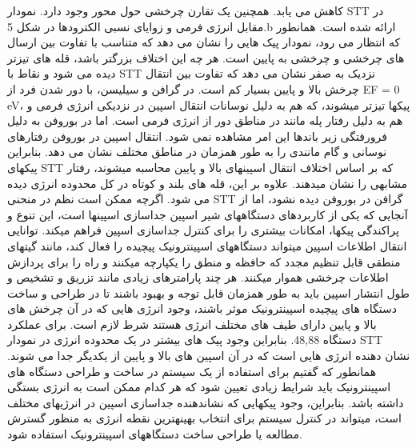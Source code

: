 کاهش می یابد. همچنین یک تقارن چرخشی حول محور وجود دارد. نمودار STT در مقابل انرژی فرمی و زوایای نسبی الکترودها در شکل 5.b ارائه شده است. همانطور که انتظار می رود، نمودار پیک هایی را نشان می دهد که متناسب با تفاوت بین ارسال های چرخشی و چرخشی به پایین است. هر چه این اختلاف بزرگتر باشد، قله های تیزتر دیده می شود و نقاط با STT نزدیک به صفر نشان می دهد که تفاوت بین انتقال چرخش بالا و پایین بسیار کم است. در گرافن و سیلیسن، با دور شدن فرد از EF = 0 eV، پیکها تیزتر میشوند، که هم به دلیل نوسانات انتقال اسپین در نزدیکی انرژی فرمی و هم به دلیل رفتار پله مانند در مناطق دور از انرژی فرمی است. اما در بوروفن به دلیل فرورفتگی زیر باندها این امر مشاهده نمی شود. انتقال اسپین در بوروفن رفتارهای نوسانی و گام مانندی را به طور همزمان در مناطق مختلف نشان می دهد. بنابراین پیکهای STT که بر اساس اختلاف انتقال اسپینهای بالا و پایین محاسبه میشوند، رفتار مشابهی را نشان میدهند. علاوه بر این، قله های بلند و کوتاه در کل محدوده انرژی دیده می شود. اگرچه ممکن است نظم در منحنی STT گرافن در بوروفن دیده نشود، اما از آنجایی که یکی از کاربردهای دستگاههای شیر اسپین جداسازی اسپینها است، این تنوع و پراکندگی پیکها، امکانات بیشتری را برای کنترل جداسازی اسپین فراهم میکند. توانایی انتقال اطلاعات اسپین میتواند دستگاههای اسپینترونیک پیچیده را فعال کند، مانند گیتهای منطقی قابل تنظیم مجدد که حافظه و منطق را یکپارچه میکنند و راه را برای پردازش اطلاعات چرخشی هموار میکنند. هر چند پارامترهای زیادی مانند تزریق و تشخیص و طول انتشار اسپین باید به طور همزمان قابل توجه و بهبود باشند تا در طراحی و ساخت دستگاه های پیچیده اسپینترونیک موثر باشند، وجود انرژی هایی که در آن چرخش های بالا و پایین دارای طیف های مختلف انرژی هستند شرط لازم است. برای عملکرد دستگاه 48,88. بنابراین وجود پیک های بیشتر در یک محدوده انرژی در نمودار STT نشان دهنده انرژی هایی است که در آن اسپین های بالا و پایین از یکدیگر جدا می شوند. همانطور که گفتیم برای استفاده از یک سیستم در ساخت و طراحی دستگاه های اسپینترونیک باید شرایط زیادی تعیین شود که هر کدام ممکن است به انرژی بستگی داشته باشد. بنابراین، وجود پیکهایی که نشاندهنده جداسازی اسپین در انرژیهای مختلف است، میتواند در کنترل سیستم برای انتخاب بهینهترین نقطه انرژی به منظور گسترش مطالعه یا طراحی ساخت دستگاههای اسپینترونیک استفاده شود.
